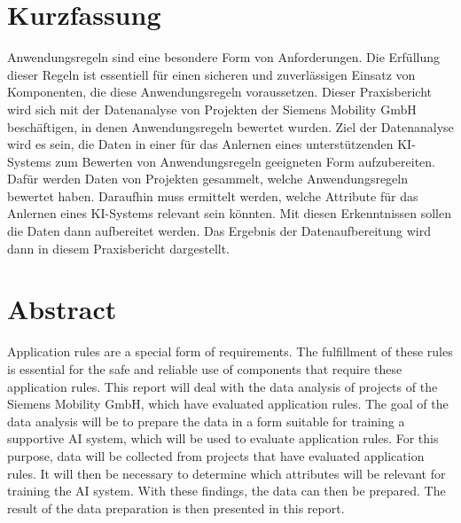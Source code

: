 \section*{Kurzfassung}
Anwendungsregeln sind eine besondere Form von Anforderungen. Die Erfüllung dieser Regeln ist essentiell für einen sicheren und zuverlässigen Einsatz von Komponenten, die diese Anwendungsregeln
voraussetzen. Dieser Praxisbericht wird sich mit der Datenanalyse von Projekten der Siemens Mobility GmbH beschäftigen, in denen Anwendungsregeln bewertet wurden. Ziel der Datenanalyse wird es sein,
die Daten in einer für das Anlernen eines unterstützenden KI-Systems zum Bewerten von Anwendungsregeln geeigneten Form aufzubereiten. Dafür werden Daten von Projekten gesammelt, welche Anwendungsregeln
bewertet haben. Daraufhin muss ermittelt werden, welche Attribute für das Anlernen eines KI-Systems relevant sein könnten. Mit diesen Erkenntnissen sollen die Daten dann aufbereitet werden. Das Ergebnis
der Datenaufbereitung wird dann in diesem Praxisbericht dargestellt.

\vfill\vfill\vfill\vfill\vfill\vfill
\section*{Abstract}
Application rules are a special form of requirements. The fulfillment of these rules is essential for the safe and reliable use of components that require these application rules.
This report will deal with the data analysis of projects of the Siemens Mobility GmbH, which have evaluated application rules. The goal of the data analysis will be to
prepare the data in a form suitable for training a supportive AI system, which will be used to evaluate application rules. For this purpose, data will be collected from projects 
that have evaluated application rules. It will then be necessary to determine which attributes will be relevant for training the AI system. With these findings, 
the data can then be prepared. The result of the data preparation is then presented in this report.
\vfill\vfill\vfill\vfill\vfill\vfill